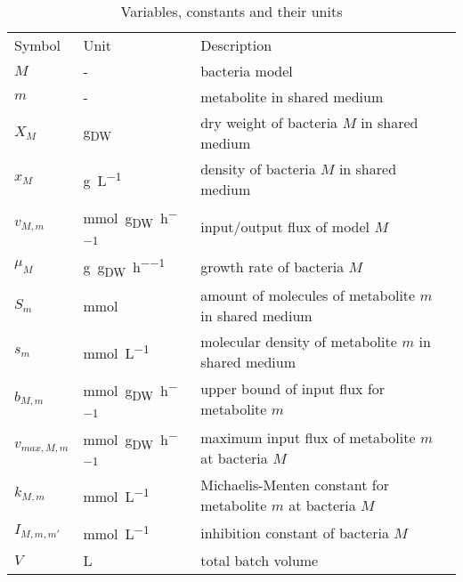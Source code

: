 \section{}
\begin{table*}[H]
\centering
\caption{Variables, constants and their units}
\label{tab:units_of_variables_and_constants}
\begin{tabular}{lll}
\rowcolor[HTML]{EFEFEF} 
Symbol                 & Unit    & Description\\
$M$                    & -       & bacteria model\\
$m$                    & -       & metabolite in shared medium\\
$X_M$                  & \si{\gram_{DW}} & dry weight of bacteria $M$ in shared medium\\
$x_M$                  & \si{\gram\per\liter} & density of bacteria $M$ in shared medium\\
$v_{M,m}$              & \si{\milli\mole\per\gram_{DW}\per\hour} & input/output flux of model $M$\\
$\mu_M$                & \si{\gram\per\gram_{DW}\per\hour} & growth rate of bacteria $M$\\
$S_m$                  & \si{\milli\mole} & amount of molecules of metabolite $m$ in shared medium\\
$s_m$                  & \si{\milli\mole\per\liter} & molecular density of metabolite $m$ in shared medium\\
$b_{M,m}$              & \si{\milli\mole\per\gram_{DW}\per\hour} & upper bound of input flux for metabolite $m$\\
$v_{max,M,m}$          & \si{\milli\mole\per\gram_{DW}\per\hour} & maximum input flux of metabolite $m$ at bacteria $M$\\
$k_{M,m}$              & \si{\milli\mole\per\liter} & Michaelis-Menten constant for metabolite $m$ at bacteria $M$\\
$I_{M,m,m'}$           & \si{\milli\mole\per\liter} & inhibition constant of bacteria $M$\\
$V$                    & \si{\liter} & total batch volume\\
\end{tabular}
\end{table*}

